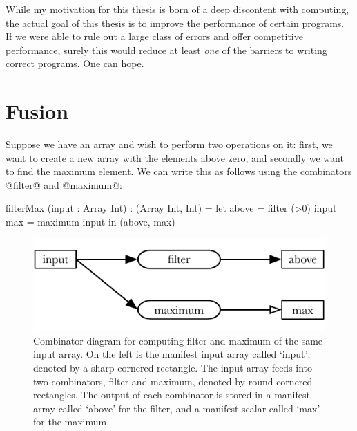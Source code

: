 While my motivation for this thesis is born of a deep discontent with computing, the actual goal of this thesis is to improve the performance of certain programs.
If we were able to rule out a large class of errors and offer competitive performance, surely this would reduce at least \emph{one} of the barriers to writing correct programs.
One can hope.

\section{Fusion}

Suppose we have an array and wish to perform two operations on it: first, we want to create a new array with the elements above zero, and secondly we want to find the maximum element.
We can write this as follows using the combinators @filter@ and @maximum@:

\begin{code}
filterMax (input : Array Int) : (Array Int, Int)
 = let above = filter (>0) input
       max   = maximum     input
   in (above, max)
\end{code}

\begin{figure}
\center
\includegraphics{figs/combinators/filtermax.pdf}
\caption[Combinator diagram for filterMax]
{Combinator diagram for computing filter and maximum of the same input array.
On the left is the manifest input array called `input', denoted by a sharp-cornered rectangle.
The input array feeds into two combinators, filter and maximum, denoted by round-cornered rectangles.
The output of each combinator is stored in a manifest array called `above' for the filter, and a manifest scalar called `max' for the maximum.}
\label{fig:combinators:filtermax}
\end{figure}


